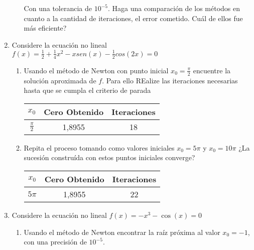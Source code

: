 \documentclass{udparticle}
\begin{document}
\begin{enumerate}
\begin{enumerate}
Con una tolerancia de $10^{-5}$. Haga una comparación de los métodos en cuanto a la cantidad de iteraciones, el error cometido. Cuál de ellos fue más eficiente?

\end{enumerate}

\item Considere la ecuación no lineal $f(x)= \frac{1}{2}+\frac{1}{4}x^2-xsen(x)-\frac{1}{2}cos(2x)=0$
	\begin{enumerate}
	\item  Usando el método de Newton con punto inicial $x_{0}=\frac{\pi}{2}$ encuentre la solución aproximada de $f$. Para ello REalize las iteraciones necesarias hasta que se cumpla el criterio de parada %
		\begin{table} [H]
			\centering
			\begin{tabular}{|c|c|c|}
				\hline
				$x_{0}$ & Cero Obtenido & Iteraciones\\
				\hline
				$\frac{\pi}{2} $ & 1,8955 & 18\\
				\hline 
			\end{tabular}
		\end{table}
	
	\item Repita el proceso tomando como valores iniciales $x_{0}=5\pi$ y $x_{0}=10\pi$ ¿La sucesión construída con estos puntos iniciales converge?
	 	\begin{table} [H]
			\centering
			\begin{tabular}{|c|c|c|}
				\hline
				$x_{0}$ & Cero Obtenido & Iteraciones\\
				\hline
				$5\pi$ & 1,8955 & 22 \\
				\hline 
			\end{tabular}
		\end{table}
	\end{enumerate}
		

\item Considere la ecuación no lineal $f(x) = -x^{3} - \cos(x) = 0$
    \begin{enumerate}
    
        \item Usando el método de Newton encontrar la raíz próxima al valor $x_{0}=-1$, con una precisión de $10^{-5}$.\\
        \begin{table}[H]
        \centering
        \begin{tabular} { |c|c|}
        

\end{tabular}
\end{table}
\end{enumerate}
\end{enumerate}
\end{document}
